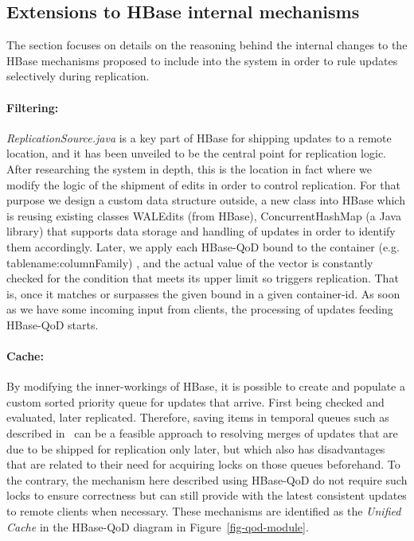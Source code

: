 \subsection{Extensions to HBase internal mechanisms}\label{extensions}
The section focuses on details on the reasoning behind the internal changes to the HBase mechanisms proposed to include into the system in order to rule updates selectively during replication.


\paragraph*{Filtering:}
\emph{ReplicationSource.java} is a key part of HBase for shipping updates to a remote location, and it has been unveiled to be the central point for replication logic. After researching the system in depth, this is the location in fact where we modify the logic of the shipment of edits in order to control replication. For that purpose we design a custom data structure outside, a new class into HBase which is reusing existing classes WALEdits (from HBase), ConcurrentHashMap (a Java library) that supports data storage and handling of updates in order to identify them accordingly. Later, we apply each HBase-QoD bound to the container (e.g. tablename:columnFamily) , and the actual value of the vector is constantly checked for the condition that meets its upper limit so triggers replication. That is, once it matches or surpasses the given bound in a given container-id. As soon as we have some incoming input from clients, the processing of updates feeding HBase-QoD starts.

\paragraph*{Cache:}
By modifying the inner-workings of HBase, it is possible to create and populate a custom sorted priority queue for updates that arrive. First being checked and evaluated, later replicated. Therefore, saving items in temporal queues such as described in~\cite{Kraska:2009} can be a feasible approach to resolving merges of updates that are due to be shipped for replication only later, but which also has disadvantages that are related to their need for acquiring locks on those queues beforehand. To the contrary, the mechanism here described using HBase-QoD do not require such locks to ensure correctness but can still provide with the latest consistent updates to remote clients when necessary. These mechanisms are identified as the \emph{Unified Cache} in the HBase-QoD diagram in Figure~\ref{fig-qod-module}.

